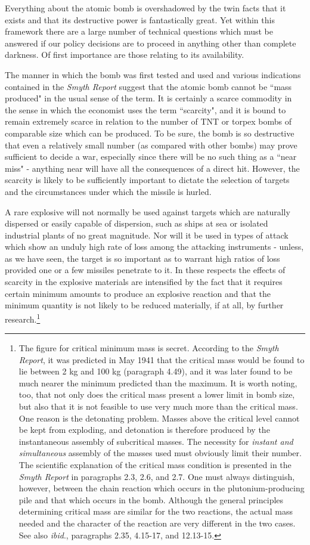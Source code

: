 Everything about the atomic bomb is overshadowed by the twin facts that it exists and that its destructive power is fantastically great. Yet within this framework there are a large number of technical questions which must be answered if our policy decisions are to proceed in anything other than complete darkness. Of first importance are those relating to its availability.

The manner in which the bomb was first tested and used and various indications contained in the \emph{Smyth Report} suggest that the atomic bomb cannot be ``mass produced" in the usual sense of the term. It is certainly a scarce commodity in the sense in which the economist uses the term ``scarcity", and it is bound to remain extremely scarce in relation to the number of TNT or torpex bombs of comparable size which can be produced. To be sure, the bomb is so destructive that even a relatively small number (as compared with other bombs) may prove sufficient to decide a war, especially since there will be no such thing as a ``near miss" - anything near will have all the consequences of a direct hit. However, the scarcity is likely to be sufficiently important to dictate the selection of targets and the circumstances under which the missile is hurled.

A rare explosive will not normally be used against targets which are naturally dispersed or easily capable of dispersion, such as ships at sea or isolated industrial plants of no great magnitude. Nor will it be used in types of attack which show an unduly high rate of loss among the attacking instruments - unless, as we have seen, the target is so important as to warrant high ratios of loss provided one or a few missiles penetrate to it. In these respects the effects of scarcity in the explosive materials are intensified by the fact that it requires certain minimum amounts to produce an explosive reaction and that the minimum quantity is not likely to be reduced materially, if at all, by further research.\footnote{The figure for critical minimum mass is secret. According to the \textit{Smyth Report}, it was predicted in May 1941 that the critical mass would be found to lie between 2 kg and 100 kg (paragraph 4.49), and it was later found to be much nearer the minimum predicted than the maximum. It is worth noting, too, that not only does the critical mass present a lower limit in bomb size, but also that it is not feasible to use very much more than the critical mass. One reason is the detonating problem. Masses above the critical level cannot be kept from exploding, and detonation is therefore produced by the instantaneous assembly of subcritical masses. The necessity for \emph{instant and simultaneous} assembly of the masses used must obviously limit their number. The scientific explanation of the critical mass condition is presented in the \textit{Smyth Report} in paragraphs 2.3, 2.6, and 2.7. One must always distinguish, however, between the chain reaction which occurs in the plutonium-producing pile and that which occurs in the bomb. Although the general principles determining critical mass are similar for the two reactions, the actual mass needed and the character of the reaction are very different in the two cases. See also \textit{ibid}., paragraphs 2.35, 4.15-17, and 12.13-15.}


